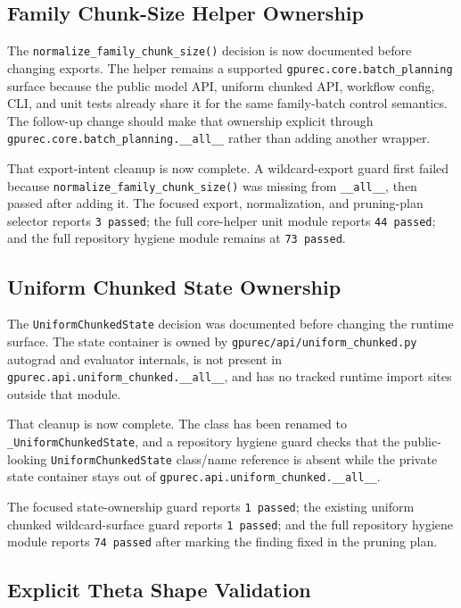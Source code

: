 \documentclass[11pt]{article}
\begin{document}
\subsection{Family Chunk-Size Helper Ownership}

The \texttt{normalize\_family\_chunk\_size()} decision is now documented before
changing exports.  The helper remains a supported
\texttt{gpurec.core.batch\_planning} surface because the public model API,
uniform chunked API, workflow config, CLI, and unit tests already share it for
the same family-batch control semantics.  The follow-up change should make that
ownership explicit through \texttt{gpurec.core.batch\_planning.\_\_all\_\_}
rather than adding another wrapper.

That export-intent cleanup is now complete.  A wildcard-export guard first
failed because \texttt{normalize\_family\_chunk\_size()} was missing from
\texttt{\_\_all\_\_}, then passed after adding it.  The focused export,
normalization, and pruning-plan selector reports \texttt{3 passed}; the full
core-helper unit module reports \texttt{44 passed}; and the full repository
hygiene module remains at \texttt{73 passed}.

\subsection{Uniform Chunked State Ownership}

The \texttt{UniformChunkedState} decision was documented before changing the
runtime surface.  The state container is owned by
\texttt{gpurec/api/uniform\_chunked.py} autograd and evaluator internals, is
not present in \texttt{gpurec.api.uniform\_chunked.\_\_all\_\_}, and has no
tracked runtime import sites outside that module.

That cleanup is now complete.  The class has been renamed to
\texttt{\_UniformChunkedState}, and a repository hygiene guard checks that the
public-looking \texttt{UniformChunkedState} class/name reference is absent while
the private state container stays out of
\texttt{gpurec.api.uniform\_chunked.\_\_all\_\_}.

The focused state-ownership guard reports \texttt{1 passed}; the existing
uniform chunked wildcard-surface guard reports \texttt{1 passed}; and the full
repository hygiene module reports \texttt{74 passed} after marking the finding
fixed in the pruning plan.

\subsection{Explicit Theta Shape Validation}
\end{document}
